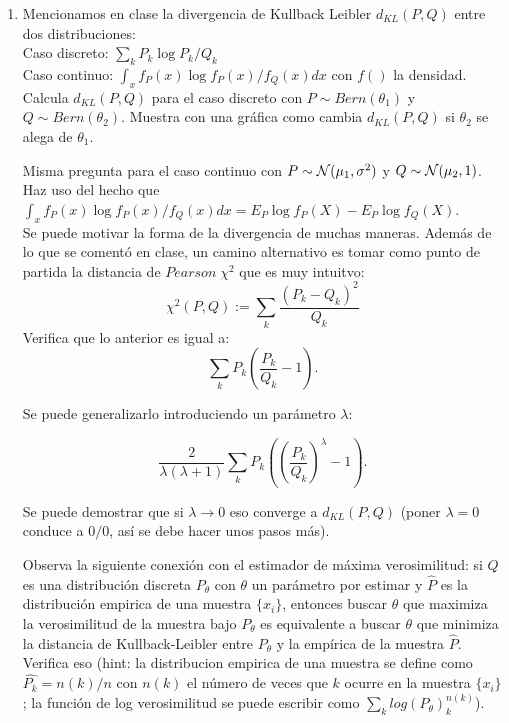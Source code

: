 \documentclass[12pt]{book}
\newcommand {\?}{?`}
\begin{document}
\begin{enumerate}
\item
Mencionamos en clase la divergencia de Kullback Leibler $d_{KL}(P,Q)$ entre dos distribuciones:\\

Caso discreto: $\sum_k P_k \log{P_k/Q_k}$\\
Caso continuo:   $\int_x f_P(x) \log{ f_P(x)/ f_Q(x) dx}$\hspace{1cm} con $f()$ la densidad.  \\

Calcula $d_{KL}(P,Q)$ para el caso discreto con $P \sim Bern(\theta_1)$ y  $Q \sim Bern(\theta_2)$. Muestra con una gr\'afica como cambia $d_{KL}(P,Q)$  si $\theta_2$ se alega de $\theta_1$.

Misma pregunta para el caso continuo con $P\sim {\cal N}(\mu_1,\sigma^2)$ y  $Q\sim {\cal N}(\mu_2,1)$. Haz uso del hecho que 
$\int_x f_P(x) \log{ f_P(x)/ f_Q(x)}dx = E_P\log f_P(X) - E_P\log f_Q(X)$. \\


Se puede motivar la forma de la divergencia de muchas maneras. Adem\'as de lo que se coment\'o en clase, un camino alternativo es tomar como punto de partida la  distancia de $Pearson \; \chi^2$ que es muy intuitvo:
\[ \chi^2(P,Q):= \sum_k \frac{(P_k - Q_k)^2}{Q_k} \]
Verifica que lo anterior es igual a:
\[  \sum_k P_k (\frac{P_k }{Q_k} - 1). \]

Se puede generalizarlo introduciendo un par\'ametro $\lambda$:

\[ \frac{2}{\lambda(\lambda+1)} \sum_k P_k ((\frac{P_k }{Q_k})^\lambda - 1). \]


Se puede demostrar que si $\lambda \rightarrow 0$ eso converge a $d_{KL}(P,Q)$ (poner $\lambda=0$ conduce  a $0/0$, as\'i se debe hacer unos pasos m\'as).


Observa la siguiente conexi\'on con el estimador de m\'axima verosimilitud: si $Q$ es una distribuci\'on discreta $P_\theta$ con $\theta$ un par\'ametro por estimar y $\hat{P}$ es la distribuci\'on empirica de una muestra $\{x_i\}$, entonces  buscar $\theta$ que maximiza la verosimilitud de la muestra bajo $P_\theta$ es equivalente a buscar $\theta$ que minimiza la distancia de Kullback-Leibler entre $P_\theta$ y la emp\'irica de la muestra $\hat{P}$. \\
Verifica eso (hint: la distribucion empirica de una muestra se define como $\hat{P_k}=n(k)/n$ con $n(k)$ el n\'umero de veces que  $k$ ocurre en la muestra $\{x_i\}$; la funci\'on de log verosimilitud se puede escribir como $\sum_k log (P_\theta)_k^{n(k)}$). \\


\end{enumerate}
\end{document}
